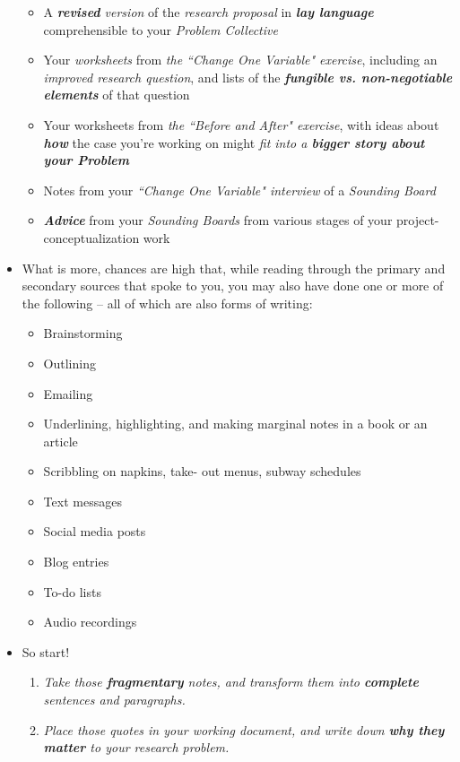 \documentclass[11pt]{article}
\begin{document}
\begin{itemize}
\begin{itemize}
\item A \emph{\textbf{revised} version} of the \emph{research proposal} in \emph{\textbf{lay language}} comprehensible to your \emph{Problem Collective}
\item Your \emph{worksheets} from \emph{the ``Change One Variable" exercise}, including an \emph{improved research question}, and lists of the \emph{\textbf{fungible vs. non-negotiable elements}}
of that question
\item Your worksheets from \emph{the ``Before and After" exercise}, with ideas about \emph{\textbf{how}} the case you’re working on might \emph{fit into a \textbf{bigger story about your Problem}}
\item Notes from your \emph{``Change One Variable" interview} of a \emph{Sounding Board}
\item \emph{\textbf{Advice}} from your \emph{Sounding Boards} from various stages of your project-conceptualization work
\end{itemize}

\item What is more, chances are high that, while reading through the primary and secondary sources that spoke to you, you may also have done one or more of the following -- all of which are also forms of writing:
\begin{itemize}
\item  Brainstorming
\item  Outlining
\item  Emailing
\item  Underlining, highlighting, and making marginal notes in a book or an article
\item  Scribbling on napkins, take- out menus, subway schedules
\item  Text messages
\item  Social media posts
\item  Blog entries
\item  To-do lists
\item  Audio recordings
\end{itemize}

\item So start!
\begin{enumerate}
\item \emph{Take those \textbf{fragmentary} notes, and transform them into \textbf{complete} sentences and paragraphs.}

\item \emph{Place those quotes in your working document, and write down \textbf{why they matter} to your research problem.}


\end{enumerate}
\end{itemize}
\end{document}
